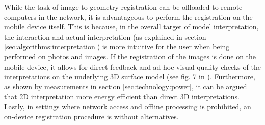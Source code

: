\documentclass[review]{elsarticle}
\begin{document}

While the task of image-to-geometry registration can be offloaded to remote computers in the network, it is advantageous to perform the registration on the mobile device itself. This is because, in the overall target of model interpretation, the interaction and actual interpretation (as explained in section \ref{sec:algorithms:interpretation}) is more intuitive for the user when being performed on photos and images. If the registration of the images is done on the mobile device, it allows for direct feedback and ad-hoc visual quality checks of the interpretations on the underlying 3D surface model (see fig. 7 in \cite{Kehl2017_VGC}). Furthermore, as shown by measurements in section \ref{sec:technology:power}, it can be argued that 2D interpretation more energy efficient than direct 3D interpretations. Lastly, in settings where network access and offline processing is prohibited, an on-device registration procedure is without alternatives.
\end{document}

